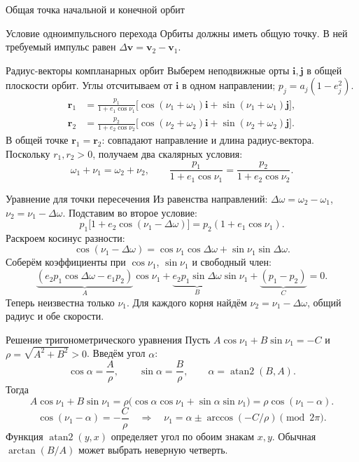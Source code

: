 \documentclass[11pt,aspectratio=169,t]{beamer}
\begin{document}
\begin{frame}{Общая точка начальной и конечной орбит}
\centering\par
\begin{block}{Условие одноимпульсного перехода}
\justifying
Орбиты должны иметь общую точку. В ней требуемый импульс равен
$\Delta\mathbf v=\mathbf v_2-\mathbf v_1$.
\end{block}
\end{frame}

\begin{frame}{Радиус-векторы компланарных орбит}
\justifying
Выберем неподвижные орты $\mathbf i,\mathbf j$ в общей плоскости орбит.
Углы отсчитываем от $\mathbf i$ в одном направлении; $p_j=a_j(1-e_j^2)$.
\begin{align*}
\mathbf r_1&=\frac{p_1}{1+e_1\cos\nu_1}
 \bigl[\cos(\nu_1+\omega_1)\mathbf i+\sin(\nu_1+\omega_1)\mathbf j\bigr],\\[3pt]
\mathbf r_2&=\frac{p_2}{1+e_2\cos\nu_2}
 \bigl[\cos(\nu_2+\omega_2)\mathbf i+\sin(\nu_2+\omega_2)\mathbf j\bigr].
\end{align*}
\justifying
В общей точке $\mathbf r_1=\mathbf r_2$: совпадают направление и длина радиус-вектора.
Поскольку $r_1,r_2>0$, получаем два скалярных условия:
\[
\omega_1+\nu_1=\omega_2+\nu_2,\qquad
\frac{p_1}{1+e_1\cos\nu_1}=\frac{p_2}{1+e_2\cos\nu_2}.
\]
\end{frame}

\begin{frame}{Уравнение для точки пересечения}
Из равенства направлений: $\Delta\omega=\omega_2-\omega_1$,
$\nu_2=\nu_1-\Delta\omega$. Подставим во второе условие:
\[
p_1\bigl[1+e_2\cos(\nu_1-\Delta\omega)\bigr]
=p_2(1+e_1\cos\nu_1).
\]
Раскроем косинус разности:
\[
\cos(\nu_1-\Delta\omega)
=\cos\nu_1\cos\Delta\omega+\sin\nu_1\sin\Delta\omega.
\]
Соберём коэффициенты при $\cos\nu_1$, $\sin\nu_1$ и свободный член:
\[
\underbrace{(e_2p_1\cos\Delta\omega-e_1p_2)}_{A}\cos\nu_1+
\underbrace{e_2p_1\sin\Delta\omega}_{B}\sin\nu_1+
\underbrace{(p_1-p_2)}_{C}=0.
\]
\justifying
Теперь неизвестна только $\nu_1$. Для каждого корня найдём
$\nu_2=\nu_1-\Delta\omega$, общий радиус и обе скорости.
\end{frame}

\begin{frame}{Решение тригонометрического уравнения}
Пусть $A\cos\nu_1+B\sin\nu_1=-C$ и $\rho=\sqrt{A^2+B^2}>0$.
Введём угол $\alpha$:
\[
\cos\alpha=\frac A\rho,\qquad \sin\alpha=\frac B\rho,
\qquad \alpha=\operatorname{atan2}(B,A).
\]
Тогда
\[
A\cos\nu_1+B\sin\nu_1
=\rho\bigl(\cos\alpha\cos\nu_1+\sin\alpha\sin\nu_1\bigr)
=\rho\cos(\nu_1-\alpha).
\]
\[
\cos(\nu_1-\alpha)=-\frac C\rho
\quad\Longrightarrow\quad
\boxed{\nu_1=\alpha\pm\arccos(-C/\rho)\pmod{2\pi}.}
\]
\justifying
Функция $\operatorname{atan2}(y,x)$ определяет угол по обоим знакам $x,y$.
Обычная $\arctan(B/A)$ может выбрать неверную четверть.
\end{frame}
\end{document}

